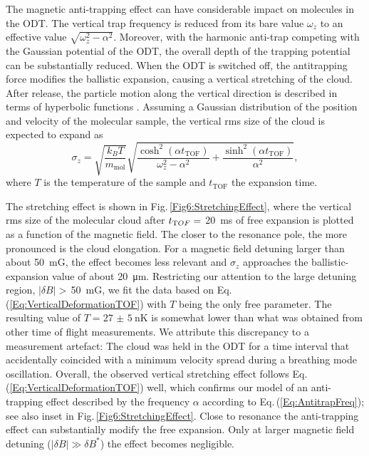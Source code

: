 The magnetic anti-trapping effect can have considerable impact on molecules in the ODT. The vertical trap frequency is reduced from its bare value $\omega_z$ to an effective value $\sqrt{\omega^2_z - \alpha^2}$. Moreover, with the harmonic anti-trap competing with the Gaussian potential of the ODT, the overall depth of the trapping potential can be substantially reduced.
When the ODT is switched off, the antitrapping force modifies the ballistic expansion, causing a vertical stretching of the cloud. After release, the particle motion along the vertical direction is described in terms of hyperbolic functions \cite{Weber2003bec,Herbig2003poa}. Assuming a Gaussian distribution of the position and velocity of the molecular sample, the vertical rms size of the cloud is expected to expand as
\begin{equation}\label{Eq:VerticalDeformationTOF}
\sigma_z=\sqrt{\frac{k_BT}{m_{\mathrm{mol}}}}\sqrt{\frac{\cosh^2(\alpha t_{\mathrm{TOF}})}{\omega_z^2-\alpha^2}+\frac{\sinh^2(\alpha t_{\mathrm{TOF}})}{\alpha^2}},
\end{equation}
where $T$ is the temperature of the sample and $t_{\mathrm{TOF}}$ the expansion time.

The stretching effect is shown in Fig.\,\ref{Fig6:StretchingEffect}, where the vertical rms size of the molecular cloud after $t_{\textrm TOF}=$ \SI{20}{\milli\second} of free expansion is plotted as a function of the magnetic field. 
The closer to the resonance pole, the more pronounced is the cloud elongation. For a magnetic field detuning larger than about \SI{50}{\milli G}, the effect becomes less relevant and $\sigma_z$ approaches the ballistic-expansion value of about \SI{20}{\micro\meter}. Restricting our attention to the large detuning region, $|\delta B|>$\,\SI{50}{\milli  G}, we fit the data based on Eq.\,(\ref{Eq:VerticalDeformationTOF}) with $T$ being the only free parameter. The resulting value of $T=\SI{27(5)}{\nano\kelvin}$ is somewhat lower than what was obtained from other time of flight measurements. We attribute this discrepancy to a measurement artefact: The cloud was held in the ODT for a time interval that accidentally coincided with a minimum velocity spread during a breathing mode oscillation.
Overall, the observed vertical stretching effect follows Eq.\,(\ref{Eq:VerticalDeformationTOF}) well, which confirms our model of an anti-trapping effect described by the frequency $\alpha$ according to Eq.\,(\ref{Eq:AntitrapFreq}); see also inset in Fig.\,\ref{Fig6:StretchingEffect}. Close to resonance the anti-trapping effect can substantially modify the free expansion. Only at larger magnetic field detuning ($|\delta B|\gg \delta B^*$) the effect becomes negligible.

